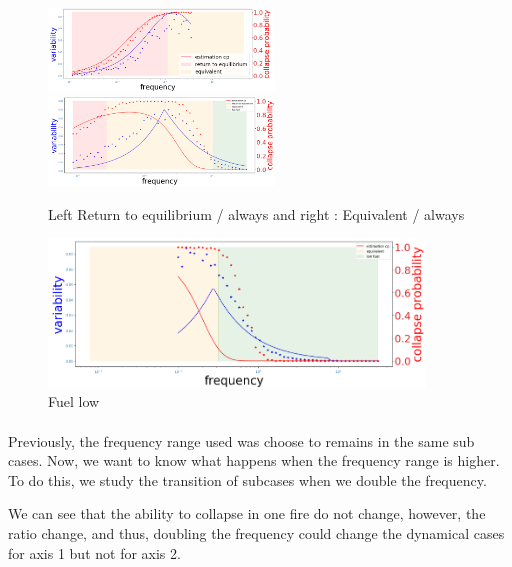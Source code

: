 \documentclass{article}
\begin{document}
\begin{figure}[h!]
\begin{center}
\includegraphics[width=6cm]{results/return_always_2.png} 
\includegraphics[width=6cm]{results/equivalent_always.png} \\
\end{center}
\caption{\label{fig:temp}Left Return to equilibrium / always and right : Equivalent / always}\end{figure}

\begin{figure}[h!]
\begin{center}
\includegraphics[width=10cm]{results/fuel_low.png}
\end{center}
\caption{\label{fig:temp}Fuel low}\end{figure}






\newpage
\paragraph{}
Previously, the frequency range used was choose to remains in the same sub cases. Now, we want to know what happens when the frequency range is higher. To do this, we study the transition of subcases when we double the frequency. 

We can see that the ability to collapse in one fire do not change, however, the ratio change, and thus, doubling the frequency could change the dynamical cases for axis 1 but not for axis 2. 
\end{document}
